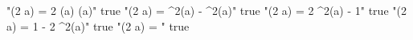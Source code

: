 "\sin(2 a) = 2 \sin(a) \cos(a)" true
"\cos(2 a) = \cos^2(a) - \sin^2(a)" true
"\cos(2 a) = 2 \cos^2(a) - 1" true
"\cos(2 a) = 1 - 2 \sin^2(a)" true
"\tan(2 a) = " true
